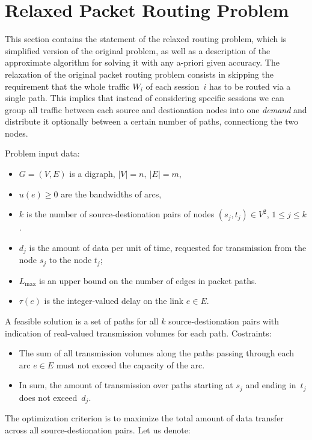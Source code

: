 \documentclass{ifacconf}
\begin{document}
\section{Relaxed Packet Routing Problem} \label{formulation}

This section contains the statement of the relaxed routing problem, which is
simplified version of the original problem, as well as a description of the approximate
algorithm for solving it with any a-priori given accuracy. The relaxation of the original packet routing problem consists in
skipping the requirement that the whole traffic $W_i$ of each
session~$i$ has to be routed via a single path. This implies
that instead of considering specific sessions we can group
all traffic between each source and destionation nodes into
one {\em demand} and distribute it optionally between a certain
number of paths, connectiong the two nodes.

Problem input data:

\begin{itemize}
 \item $G = (V,E)$ is a digraph, $|V|=n, \ |E|=m$,
 \item $u(e)\ge 0$ are the bandwidths of arcs,
 \item $k$ is the number of  source-destionation pairs of nodes $(s_j, t_j)\in V^2$, $1\le j \le k$.
 \item $d_j$ is the amount of data per unit of time, requested for transmission from the node $s_j$ to the node $t_j$;
\item $L_{\max}$ is an upper bound on the number of edges in packet paths.
 \item $\tau(e)$ is the integer-valued delay on the link $e\in E$.
 \end{itemize}

A feasible solution is a set of paths for all $k$ source-destionation pairs with indication of real-valued
transmission volumes for each path. Costraints:
\begin{itemize}
\item The sum of all transmission volumes along the paths passing through each
arc $e\in E$ must not exceed the capacity of the arc.

\item In sum, the amount of transmission over paths starting at $s_j$ and
ending in~$t_j$ does not exceed~$d_j$.
\end{itemize}

The optimization criterion is to maximize the total amount of data transfer across all 
source-destionation pairs. 
Let us denote:
\end{document}
